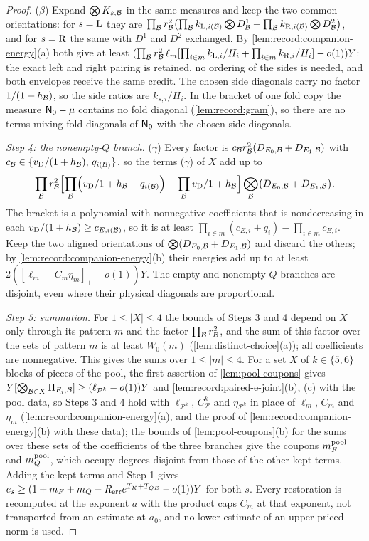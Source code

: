 \begin{proof}
($\beta$) Expand $\bigotimes K_{s,\mathcal B}$ in the same measures and keep the two common
orientations: for $s={\rm L}$ they are
$\prod_\mathcal B r_\mathcal B^2\bigl(\prod_\mathcal B k_{{\rm L},i(\mathcal B)}\bigotimes D^1_\mathcal B
+\prod_\mathcal B k_{{\rm R},i(\mathcal B)}\bigotimes D^2_\mathcal B\bigr)$, and for $s={\rm R}$ the same with
$D^1$ and $D^2$ exchanged. By \cref{lem:record:companion-energy}(a) both give at
least $(\prod_\mathcal B r_\mathcal B^2\,\ell_m[\prod_{i\in m}k_{{\rm L},i}/H_i+\prod_{i\in m}k_{{\rm R},i}/H_i]
-o(1))Y$: the exact left and right pairing is retained, no ordering of the
sides is needed, and both envelopes receive the same credit. The chosen side
diagonals carry no factor $1/(1+h_\mathcal B)$, so the side ratios are $k_{s,i}/H_i$. In
the bracket of one fold copy the measure $\mathsf N_0-\mu$ contains no fold diagonal
(\cref{lem:record:gram}), so there are no terms mixing fold diagonals of $\mathsf N_0$
with the chosen side diagonals.

\emph{Step 4: the nonempty-$Q$ branch.} ($\gamma$) Every factor is
$c_\mathcal B r_\mathcal B^2(D_{E_0,\mathcal B}+D_{E_1,\mathcal B})$ with
$c_\mathcal B\in\{v_{\rm D}/(1+h_\mathcal B),\,q_{i(\mathcal B)}\}$, so the terms ($\gamma$) of $X$ add up
to
\[
 \prod_\mathcal B r_\mathcal B^2\Bigl[\prod_\mathcal B\Bigl(v_{\rm D}/1+h_\mathcal B+q_{i(\mathcal B)}\Bigr)
 -\prod_\mathcal Bv_{\rm D}/1+h_\mathcal B\Bigr]\bigotimes_\mathcal B\bigl(D_{E_0,\mathcal B}+D_{E_1,\mathcal B}\bigr).
\]
The bracket is a polynomial with
nonnegative coefficients that is nondecreasing in each $v_{\rm D}/(1+h_\mathcal B)\ge
c_{E,i(\mathcal B)}$, so it is at least $\prod_{i\in m}(c_{E,i}+q_i)-\prod_{i\in m}c_{E,i}$.
Keep the two aligned orientations of $\bigotimes(D_{E_0,\mathcal B}+D_{E_1,\mathcal B})$ and discard
the others; by \cref{lem:record:companion-energy}(b) their energies add up to at
least $2([\ell_m-C_m\eta_m]_+-o(1))Y$. The empty and nonempty $Q$ branches are
disjoint, even where their physical diagonals are proportional.

\emph{Step 5: summation.} For $1\le|X|\le4$ the bounds of Steps 3 and 4 depend on
$X$ only through its pattern $m$ and the factor $\prod_\mathcal B r_\mathcal B^2$, and the sum of
this factor over the sets of pattern $m$ is at least $W_0(m)$
(\cref{lem:distinct-choice}(a)); all coefficients are nonnegative. This gives the
sums over $1\le|m|\le4$. For a set $X$ of $k\in\{5,6\}$ blocks of pieces of the
pool, the first assertion of \cref{lem:pool-coupons} gives
$Y[\bigotimes_{\mathcal B\in X}\Pi_{F_j,\mathcal B}]\ge(\ell_{\mathcal P^k}-o(1))Y$ and
\cref{lem:record:paired-e-joint}(b), (c) with the pool data, so Steps 3 and 4 hold
with $\ell_{\mathcal P^k}$, $C_{\mathcal P}^k$ and $\eta_{\mathcal P^k}$ in place of
$\ell_m$, $C_m$ and $\eta_m$ (\cref{lem:record:companion-energy}(a), and the proof of
\cref{lem:record:companion-energy}(b) with these data);
the bounds of \cref{lem:pool-coupons}(b) for the sums over these sets of the
coefficients of the three branches give the coupons $m^{\rm pool}_F$ and
$m^{\rm pool}_Q$, which occupy degrees disjoint from those of the other kept terms.
Adding the kept terms and Step 1 gives
$e_s\ge(1+m_F+m_Q-R_{\rm err}e^{T_K+T_{QE}}-o(1))Y$ for both $s$. Every restoration is recomputed at the exponent $a$ with the product caps $C_m$ at that exponent, not transported from an estimate at $a_0$, and no lower estimate
of an upper-priced norm is used.


\end{proof}
